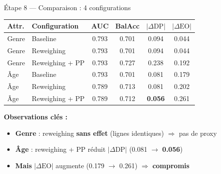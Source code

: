 \documentclass[aspectratio=169, 11pt]{beamer}
\begin{document}
\begin{frame}{\'Etape 8 --- Comparaison : 4 configurations}
\small
\begin{table}
\centering
\begin{tabular}{llcccc}
\toprule
\textbf{Attr.} & \textbf{Configuration} & \textbf{AUC} & \textbf{BalAcc} & $|\Delta\text{DP}|$ & $|\Delta\text{EO}|$ \\
\midrule
Genre & Baseline          & 0.793 & 0.701 & 0.094 & 0.044 \\
Genre & Reweighing        & 0.793 & 0.701 & 0.094 & 0.044 \\
Genre & Reweighing + PP   & 0.793 & 0.727 & 0.238 & 0.192 \\
\midrule
\^Age  & Baseline          & 0.793 & 0.701 & 0.081 & 0.179 \\
\^Age  & Reweighing        & 0.789 & 0.713 & 0.081 & 0.202 \\
\^Age  & Reweighing + PP   & 0.789 & 0.712 & \textbf{0.056} & 0.261 \\
\bottomrule
\end{tabular}
\end{table}

\vspace{0.3em}
\normalsize
\textbf{Observations cl\'es :}
\begin{itemize}
    \item \textbf{Genre} : reweighing \textbf{sans effet} (lignes identiques) $\Rightarrow$ pas de proxy
    \item \textbf{\^Age} : reweighing + PP r\'eduit $|\Delta\text{DP}|$ (0.081 $\to$ \textbf{0.056})
    \item \textbf{Mais} $|\Delta\text{EO}|$ augmente (0.179 $\to$ 0.261) $\Rightarrow$ \textbf{compromis}
\end{itemize}
\end{frame}
\end{document}
